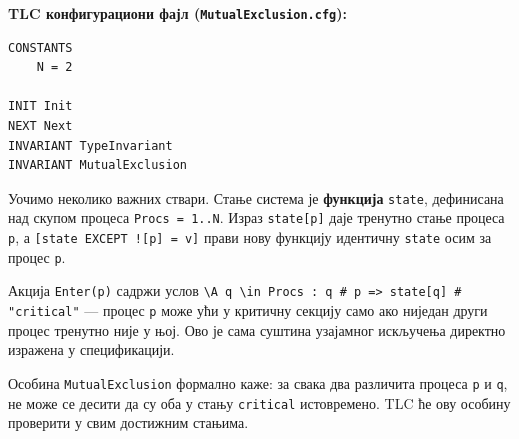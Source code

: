 \begin{primer}
\textbf{TLC конфигурациони фајл (\texttt{MutualExclusion.cfg}):}
\begin{lstlisting}
CONSTANTS
    N = 2

INIT Init
NEXT Next
INVARIANT TypeInvariant
INVARIANT MutualExclusion
\end{lstlisting}

Уочимо неколико важних ствари.
Стање система је \textbf{функција} \texttt{state}, дефинисана над скупом процеса \texttt{Procs = 1..N}.
Израз \texttt{state[p]} даје тренутно стање процеса \texttt{p}, а \texttt{[state EXCEPT ![p] = v]} прави нову функцију идентичну \texttt{state} осим за процес \texttt{p}.

Акција \texttt{Enter(p)} садржи услов \texttt{\textbackslash A q \textbackslash in Procs : q \# p => state[q] \# "critical"} --- процес \texttt{p} може ући у критичну секцију само ако ниједан други процес тренутно није у њој.
Ово је сама суштина узајамног искључења директно изражена у спецификацији.

Особина \texttt{MutualExclusion} формално каже: за свака два различита процеса \texttt{p} и \texttt{q}, не може се десити да су оба у стању \texttt{critical} истовремено.
TLC ће ову особину проверити у свим достижним стањима.
\end{primer}

